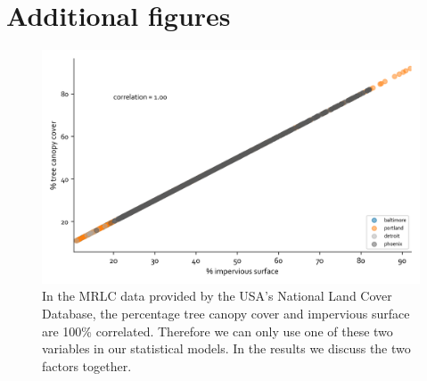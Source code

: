 \documentclass[final,3p,times,onecolumn,sort&compress]{elsarticle}
\begin{document}
\section{Additional figures}
\begin{figure}[h]
    \centering
    \includegraphics[width=\linewidth]{fig/report/imp_v_tree_500.png}
    \caption{
    In the MRLC data provided by the USA's National Land Cover Database, the percentage tree canopy cover and impervious surface are 100\% correlated. Therefore we can only use one of these two variables in our statistical models. In the results we discuss the two factors together.
    }
    \label{fig:imp_tree}
\end{figure}
\end{document}
